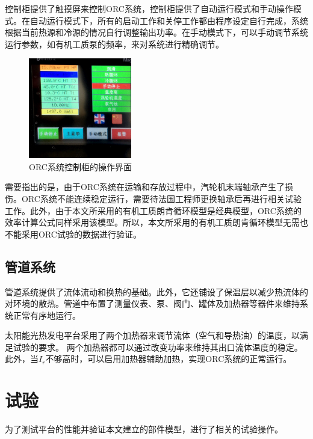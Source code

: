 控制柜提供了触摸屏来控制ORC系统，控制柜提供了自动运行模式和手动操作模式。在自动运行模式下，所有的启动工作和关停工作都由程序设定自行完成，系统根据当前热源和冷源的情况自行调整输出功率。在手动模式下，可以手动调节系统运行参数，如有机工质泵的频率，来对系统进行精确调节。

\begin{figure}[!ht]
\centering
\includegraphics[width=0.4\textwidth]{fig/ControlCabinet}
\caption{ORC系统控制柜的操作界面}\label{fig:ControlCabinet}
\end{figure}

需要指出的是，由于ORC系统在运输和存放过程中，汽轮机末端轴承产生了损伤。ORC系统不能连续稳定运行，需要待法国工程师更换轴承后再进行相关试验工作。此外，由于本文所采用的有机工质朗肯循环模型是经典模型，ORC系统的效率计算公式同样采用该模型。所以，本文所采用的有机工质朗肯循环模型无需也不能采用ORC试验的数据进行验证。

\subsection{管道系统}

管道系统提供了流体流动和换热的基础。此外，它还铺设了保温层以减少热流体的对环境的散热。管道中布置了测量仪表、泵、阀门、罐体及加热器等器件来维持系统正常有序地运行。

太阳能光热发电平台采用了两个加热器来调节流体（空气和导热油）的温度，以满足试验的要求。
两个加热器都可以通过改变功率来维持其出口流体温度的稳定。
此外，当$I_r$不够高时，可以启用加热器辅助加热，实现ORC系统的正常运行。

\section{试验}

为了测试平台的性能并验证本文建立的部件模型，进行了相关的试验操作。

